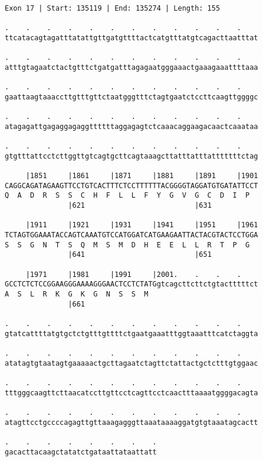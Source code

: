 \documentclass{article}
\begin{document}
\begin{Verbatim}[fontfamily=courier]
Exon 17 | Start: 135119 | End: 135274 | Length: 155

.    .    .    .    .    .    .    .    .    .    .    .    
ttcatacagtagatttatattgttgatgttttactcatgtttatgtcagacttaatttat

.    .    .    .    .    .    .    .    .    .    .    .    
atttgtagaatctactgtttctgatgatttagagaatgggaaactgaaagaaattttaaa

.    .    .    .    .    .    .    .    .    .    .    .    
gaattaagtaaaccttgtttgttctaatgggtttctagtgaatctccttcaagttggggc

.    .    .    .    .    .    .    .    .    .    .    .    
atagagattgagaggagaggttttttaggagagtctcaaacaggaagacaactcaaataa

.    .    .    .    .    .    .    .    .    .    .    .    
gtgtttattcctcttggttgtcagtgcttcagtaaagcttatttatttatttttttctag

     |1851     |1861     |1871     |1881     |1891     |1901
CAGGCAGATAGAAGTTCCTGTCACTTTCTCCTTTTTTACGGGGTAGGATGTGATATTCCT
Q  A  D  R  S  S  C  H  F  L  L  F  Y  G  V  G  C  D  I  P  
               |621                          |631           

     |1911     |1921     |1931     |1941     |1951     |1961
TCTAGTGGAAATACCAGTCAAATGTCCATGGATCATGAAGAATTACTACGTACTCCTGGA
S  S  G  N  T  S  Q  M  S  M  D  H  E  E  L  L  R  T  P  G  
               |641                          |651           

     |1971     |1981     |1991     |2001.    .    .    .    
GCCTCTCTCCGGAAGGGAAAAGGGAACTCCTCTATGgtcagcttcttctgtactttttct
A  S  L  R  K  G  K  G  N  S  S  M                          
               |661                                         

.    .    .    .    .    .    .    .    .    .    .    .    
gtatcattttatgtgctctgtttgttttctgaatgaaatttggtaaatttcatctaggta

.    .    .    .    .    .    .    .    .    .    .    .    
atatagtgtaatagtgaaaaactgcttagaatctagttctattactgctctttgtggaac

.    .    .    .    .    .    .    .    .    .    .    .    
tttgggcaagttcttaacatccttgttcctcagttcctcaactttaaaatggggacagta

.    .    .    .    .    .    .    .    .    .    .    .    
atagttcctgccccagagttgttaaagagggttaaataaaaggatgtgtaaatagcactt

.    .    .    .    .    .    .    .
gacacttacaagctatatctgataattataattatt
\end{Verbatim}
\end{document}
